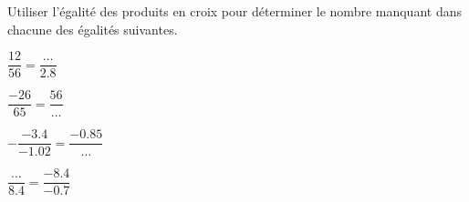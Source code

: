 \begin{exercice*}
    Utiliser l'égalité des produits en croix pour déterminer le nombre manquant dans chacune des égalités suivantes.
    \begin{multicols}{2}
        \begin{enumerate}
            \begin{spacing}{2}
                \item $\dfrac{12}{56}=\dfrac{\dots{}}{\num{2.8}}$
                \item $\dfrac{-26}{65}=\dfrac{56}{\dots{}}$
                \item $-\dfrac{\num{-3.4}}{\num{-1.02}}=\dfrac{\num{-0.85}}{\dots{}}$
                \item $\dfrac{\dots{}}{\num{8.4}}=\dfrac{\num{-8.4}}{\num{-0.7}}$                 
            \end{spacing}
        \end{enumerate}           
    \end{multicols}
\end{exercice*}
